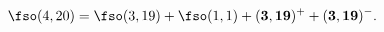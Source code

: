 \begin{equation}\fso(4,20)=\fso(3,19)+\fso(1,1)+
(\mathbf{3},\mathbf{19})^++(\mathbf{3},\mathbf{19})^-.\label{decomp}\end{equation}

